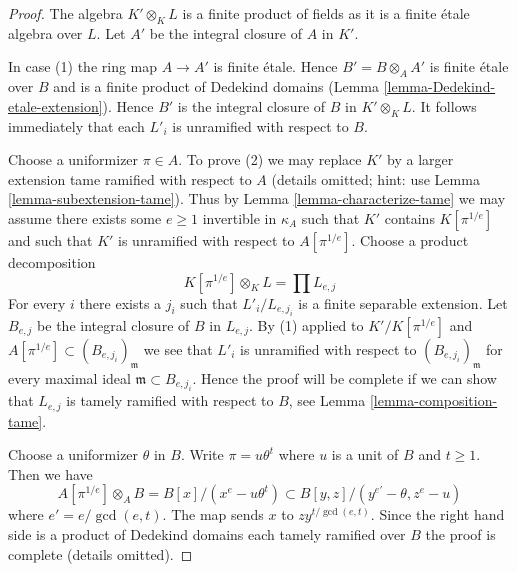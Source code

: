 \documentclass[10pt,a4paper]{amsart}
\theoremstyle{plain}
\theoremstyle{definition}
\theoremstyle{remark}
\numberwithin{equation}{subsection}
\begin{document}
\begin{proof}
The algebra $K' \otimes_K L$ is a finite product of fields as it is
a finite \'etale algebra over $L$.
Let $A'$ be the integral closure of $A$ in $K'$.

\medskip\noindent
In case (1) the ring map $A \to A'$ is finite \'etale.
Hence $B' = B \otimes_A A'$ is finite \'etale over $B$ and
is a finite product of Dedekind domains
(Lemma \ref{lemma-Dedekind-etale-extension}).
Hence $B'$ is the integral closure of $B$ in $K' \otimes_K L$.
It follows immediately that each $L'_i$ is unramified
with respect to $B$.

\medskip\noindent
Choose a uniformizer $\pi \in A$. To prove (2) we may replace $K'$
by a larger extension tame ramified with respect to $A$ (details omitted;
hint: use Lemma \ref{lemma-subextension-tame}).
Thus by Lemma \ref{lemma-characterize-tame} we may assume
there exists some $e \geq 1$ invertible in $\kappa_A$ such that
$K'$ contains $K[\pi^{1/e}]$ and such that $K'$ is unramified with respect
to $A[\pi^{1/e}]$. Choose a product decomposition
$$
K[\pi^{1/e}] \otimes_K L = \prod L_{e, j}
$$
For every $i$ there exists a $j_i$ such that
$L'_i/L_{e, j_i}$ is a finite separable extension.
Let $B_{e, j}$ be the integral closure of $B$ in $L_{e, j}$.
By (1) applied to $K'/K[\pi^{1/e}]$ and
$A[\pi^{1/e}] \subset (B_{e, j_i})_\mathfrak m$
we see that $L'_i$ is unramified with respect to $(B_{e, j_i})_\mathfrak m$
for every maximal ideal $\mathfrak m \subset B_{e, j_i}$.
Hence the proof will be complete if we can show that
$L_{e, j}$ is tamely ramified with respect to $B$, see
Lemma \ref{lemma-composition-tame}.

\medskip\noindent
Choose a uniformizer $\theta$ in $B$.
Write $\pi = u \theta^t$ where $u$ is a unit of $B$ and $t \geq 1$.
Then we have
$$
A[\pi^{1/e}] \otimes_A B = B[x]/(x^e - u \theta^t)
\subset B[y, z]/(y^{e'} - \theta, z^e - u)
$$
where $e' = e/\gcd(e, t)$. The map sends $x$ to
$z y^{t/\gcd(e, t)}$. Since the right hand side is
a product of Dedekind domains each tamely ramified
over $B$ the proof is complete (details omitted).
\end{proof}
\end{document}
